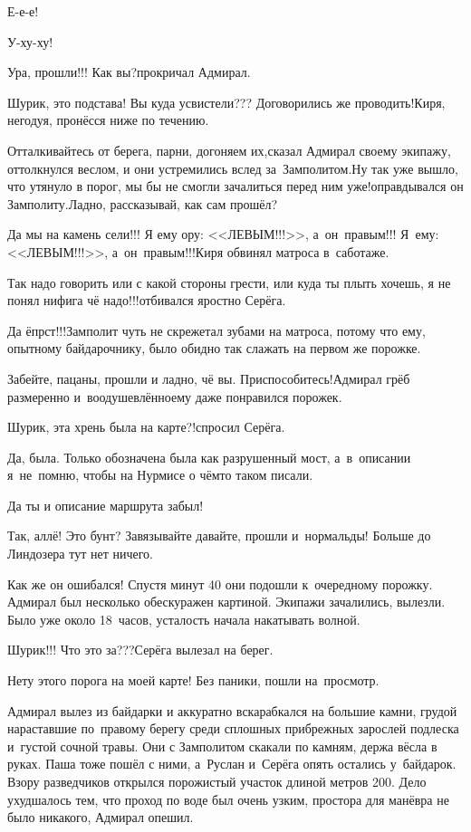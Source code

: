 \diagdash Е-е-е!

\diagdash У-ху-ху!

\diagdash Ура, прошли!!! Как вы?\mdash прокричал Адмирал.

\diagdash Шурик, это подстава! Вы куда усвистели??? Договорились же проводить!\mdash Киря, негодуя, пронёсся ниже по течению.

\diagdash Отталкивайтесь от берега, парни, догоняем их,\mdash сказал Адмирал своему экипажу, оттолкнулся веслом, и они устремились вслед за~Замполитом.\mdash Ну так уже вышло, что утянуло в порог, мы бы не смогли зачалиться перед ним уже!\mdash оправдывался он Замполиту.\mdash Ладно, рассказывай, как сам прошёл?

\diagdash Да мы на камень сели!!! Я ему ору: <<ЛЕВЫМ!!!>>, а~он~правым!!! Я~ему: <<ЛЕВЫМ!!!>>, а~он~правым!!!\mdash Киря обвинял матроса в~саботаже.

\diagdash Так надо говорить или с какой стороны грести, или куда ты плыть хочешь, я не понял нифига чё надо!!!\mdash отбивался яростно Серёга.

\diagdash Да ёпрст!!!\mdash Замполит чуть не скрежетал зубами на матроса, потому что ему, опытному байдарочнику, было обидно так слажать на первом же порожке.

\diagdash Забейте, пацаны, прошли и ладно, чё вы. Приспособитесь!\mdash Адмирал грёб размеренно и~воодушевлённо\mdash ему даже понравился порожек.

\diagdash Шурик, эта хрень была на карте?!\mdash спросил Серёга.

\diagdash Да, была. Только обозначена была как разрушенный мост, а~в~описании я~не~помню, чтобы на Нурмисе о чём\sdash то таком писали.

\diagdash Да ты и описание маршрута забыл!

\diagdash Так, аллё! Это бунт? Завязывайте давайте, прошли и~нормальды! Больше до Линдозера тут нет ничего.

Как же он ошибался! Спустя минут 40 они подошли к~очередному порожку. Адмирал был несколько обескуражен картиной. Экипажи зачалились, вылезли. Было уже около 18~часов, усталость начала накатывать волной.

\diagdash Шурик!!! Что это за???\mdash Серёга вылезал на берег.

\diagdash Нету этого порога на моей карте! Без паники, пошли на~просмотр.

Адмирал вылез из байдарки и аккуратно вскарабкался на большие камни, грудой нараставшие по~правому берегу среди сплошных прибрежных зарослей подлеска и~густой сочной травы. Они с Замполитом скакали по камням, держа вёсла в руках. Паша тоже пошёл с ними, а~Руслан и~Серёга опять остались у~байдарок. Взору разведчиков открылся порожистый участок длиной метров 200. Дело ухудшалось тем, что проход по воде был очень узким, простора для манёвра не было никакого, Адмирал опешил.


